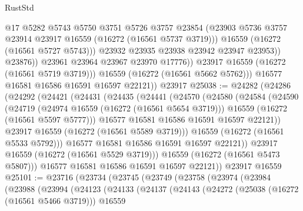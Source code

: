 \begin{lexlean}{RustStd}
\begin{coremodule}
                          @17
                          @5282
                          @5743
                          @5750
                          @3751
                          @5726
                          @3757
                          @23854
                          (@23903 @5736 @3757 @23914 @23917 @16559 (@16272 (@16561 @5737 @3719)))
                          @16559
                          (@16272 (@16561 @5727 @5743)))
                        @23932
                        @23935
                        @23938
                        @23942
                        @23947
                        @23953))
                    @23876))
                @23961
                @23964
                @23967
                @23970
                @17776))
            @23917
            @16559
            (@16272 (@16561 @5719 @3719)))
          @16559
          (@16272 (@16561 @5662 @5762)))
        @16577
        @16581
        @16586
        @16591
        @16597
        @22121))
    @23917
@25038 := @24282
    (@24286
      (@24292
        (@24421
          (@24431
            (@24435
              (@24441
                (@24570
                  (@24580
                    (@24584
                      (@24590
                        (@24719
                          (@24974 @16559 (@16272 (@16561 @5654 @3719)))
                          @16559
                          (@16272 (@16561 @5597 @5777)))
                        @16577
                        @16581
                        @16586
                        @16591
                        @16597
                        @22121))
                    @23917
                    @16559
                    (@16272 (@16561 @5589 @3719)))
                  @16559
                  (@16272 (@16561 @5533 @5792)))
                @16577
                @16581
                @16586
                @16591
                @16597
                @22121))
            @23917
            @16559
            (@16272 (@16561 @5529 @3719)))
          @16559
          (@16272 (@16561 @5473 @5807)))
        @16577
        @16581
        @16586
        @16591
        @16597
        @22121))
    @23917
    @16559
@25101 := @23716
    (@23734
      (@23745
        (@23749
          (@23758
            (@23974
              (@23984
                (@23988
                  (@23994
                    (@24123
                      (@24133
                        (@24137
                          (@24143
                            (@24272
                              (@25038 (@16272 (@16561 @5466 @3719)))
                              @16559

\end{coremodule}
\end{lexlean}
